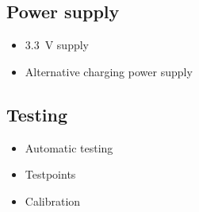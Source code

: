 \FloatBarrier

\subsection{Power supply}
\label{sec_power_supply}
\begin{itemize}
    \item \qty{3.3}{\volt} supply
    \item Alternative charging power supply
\end{itemize}

\FloatBarrier

\subsection{Testing}
\label{sec_testing}
\begin{itemize}
    \item Automatic testing
    \item Testpoints
    \item Calibration
\end{itemize}

\FloatBarrier
